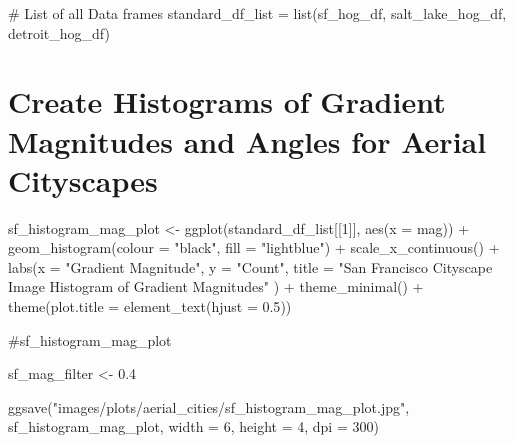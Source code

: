 \documentclass[
  letterpaper,
  DIV=11,
  numbers=noendperiod]{scrreprt}
\newenvironment{Shaded}{\begin{snugshade}}{\end{snugshade}}
\newcommand{\AttributeTok}[1]{\textcolor[rgb]{0.40,0.45,0.13}{#1}}
\newcommand{\CommentTok}[1]{\textcolor[rgb]{0.37,0.37,0.37}{#1}}
\newcommand{\DecValTok}[1]{\textcolor[rgb]{0.68,0.00,0.00}{#1}}
\newcommand{\FloatTok}[1]{\textcolor[rgb]{0.68,0.00,0.00}{#1}}
\newcommand{\FunctionTok}[1]{\textcolor[rgb]{0.28,0.35,0.67}{#1}}
\newcommand{\NormalTok}[1]{\textcolor[rgb]{0.00,0.23,0.31}{#1}}
\newcommand{\OtherTok}[1]{\textcolor[rgb]{0.00,0.23,0.31}{#1}}
\newcommand{\SpecialCharTok}[1]{\textcolor[rgb]{0.37,0.37,0.37}{#1}}
\newcommand{\StringTok}[1]{\textcolor[rgb]{0.13,0.47,0.30}{#1}}
\begin{document}
\begin{Shaded}
\begin{Highlighting}[]
\CommentTok{\# List of all Data frames}
\NormalTok{standard\_df\_list }\OtherTok{=} \FunctionTok{list}\NormalTok{(sf\_hog\_df,}
\NormalTok{                        salt\_lake\_hog\_df, }
\NormalTok{                        detroit\_hog\_df)}
\end{Highlighting}
\end{Shaded}

\section{Create Histograms of Gradient Magnitudes and Angles for Aerial
Cityscapes}\label{create-histograms-of-gradient-magnitudes-and-angles-for-aerial-cityscapes}

\begin{Shaded}
\begin{Highlighting}[]
\NormalTok{sf\_histogram\_mag\_plot }\OtherTok{\textless{}{-}}
  \FunctionTok{ggplot}\NormalTok{(standard\_df\_list[[}\DecValTok{1}\NormalTok{]], }
         \FunctionTok{aes}\NormalTok{(}\AttributeTok{x =}\NormalTok{ mag)) }\SpecialCharTok{+}
  \FunctionTok{geom\_histogram}\NormalTok{(}\AttributeTok{colour =} \StringTok{"black"}\NormalTok{, }\AttributeTok{fill =} \StringTok{"lightblue"}\NormalTok{) }\SpecialCharTok{+}
  \FunctionTok{scale\_x\_continuous}\NormalTok{() }\SpecialCharTok{+} 
  \FunctionTok{labs}\NormalTok{(}\AttributeTok{x =} \StringTok{"Gradient Magnitude"}\NormalTok{, }
       \AttributeTok{y =} \StringTok{"Count"}\NormalTok{, }
       \AttributeTok{title =} \StringTok{"San Francisco Cityscape Image Histogram of Gradient Magnitudes"}
\NormalTok{       ) }\SpecialCharTok{+}
  \FunctionTok{theme\_minimal}\NormalTok{() }\SpecialCharTok{+}
  \FunctionTok{theme}\NormalTok{(}\AttributeTok{plot.title =} \FunctionTok{element\_text}\NormalTok{(}\AttributeTok{hjust =} \FloatTok{0.5}\NormalTok{))}

\CommentTok{\#sf\_histogram\_mag\_plot}

\NormalTok{sf\_mag\_filter }\OtherTok{\textless{}{-}} \FloatTok{0.4}

\FunctionTok{ggsave}\NormalTok{(}\StringTok{"images/plots/aerial\_cities/sf\_histogram\_mag\_plot.jpg"}\NormalTok{, sf\_histogram\_mag\_plot, }\AttributeTok{width =} \DecValTok{6}\NormalTok{, }\AttributeTok{height =} \DecValTok{4}\NormalTok{, }\AttributeTok{dpi =} \DecValTok{300}\NormalTok{)}
\end{Highlighting}
\end{Shaded}
\end{document}
